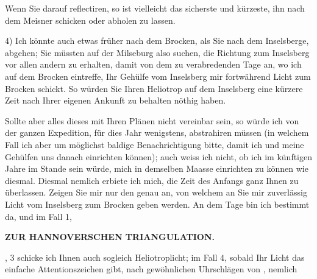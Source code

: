 Wenn Sie darauf reflectiren, so ist vielleicht das sicherste und kürzeste, ihn nach dem Meisner schicken oder abholen zu lassen.
\par\noindent\hspace*{\parindent}4) Ich könnte auch etwas früher nach dem Brocken, als Sie nach dem Inselsberge, abgehen; Sie müssten auf der Milseburg also suchen, die Richtung zum Inselsberg vor allen andern zu erhalten, damit von dem zu verabredenden Tage an, wo ich auf dem Brocken eintreffe, Ihr Gehülfe vom Inselsberg mir fortwährend Licht zum Brocken schickt.
So würden Sie Ihren Heliotrop auf dem Inselsberg eine kürzere Zeit nach Ihrer eigenen Ankunft zu behalten nöthig haben.
\par\noindent\hspace*{\parindent}Sollte aber alles dieses mit Ihren Plänen nicht vereinbar sein, so würde ich von der ganzen Expedition, für dies Jahr wenigstens, abstrahiren müssen (in welchem Fall ich aber um möglichst baldige Benachrichtigung bitte, damit ich und meine Gehülfen uns danach einrichten können); auch weiss ich nicht, ob ich im künftigen Jahre im Stande sein würde, mich in demselben Maasse einrichten zu können wie diesmal.
Diesmal nemlich erbiete ich mich, die Zeit des Anfangs ganz Ihnen zu überlassen.
Zeigen Sie mir nur den  genau an, von welchem an Sie mir zuverlässig Licht vom Inselsberg zum Brocken geben werden.
An dem Tage bin ich bestimmt da, und im Fall 1,
\par\clearpage
\noindent\null\hfill{\small\textbf{ZUR HANNOVERSCHEN TRIANGULATION.}}\hfill{}\par\medskip
{}, 3 schicke ich Ihnen auch sogleich Heliotroplicht; im Fall 4, sobald Ihr Licht das einfache Attentionszeichen gibt, nach gewöhnlichen Uhrschlägen von , nemlich
\par\smallskip
{\centering
{}\par}
